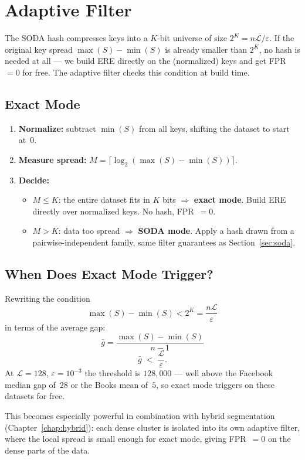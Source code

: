 \section{Adaptive Filter}
\label{sec:adaptive}

The SODA hash compresses keys into a $K$-bit universe of size $2^K = n\mathcal{L}/\varepsilon$.
If the original key spread $\max(S) - \min(S)$ is already smaller than $2^K$,
no hash is needed at all --- we build ERE directly on the (normalized) keys
and get FPR~$= 0$ for free.
The adaptive filter checks this condition at build time.

\subsection{Exact Mode}
\label{subsec:exact-mode}

\begin{enumerate}
    \item \textbf{Normalize:} subtract $\min(S)$ from all keys, shifting the dataset to
    start at~0.
    \item \textbf{Measure spread:} $M = \lceil \log_2(\max(S) - \min(S)) \rceil$.
    \item \textbf{Decide:}
    \begin{itemize}
        \item $M \leq K$: the entire dataset fits in $K$ bits $\Rightarrow$ \textbf{exact
        mode}. Build ERE directly over normalized keys. No hash, FPR~$= 0$.
        \item $M > K$: data too spread $\Rightarrow$ \textbf{SODA mode}. Apply
        a hash drawn from a pairwise-independent family, same filter guarantees as Section~\ref{sec:soda}.
    \end{itemize}
\end{enumerate}

\subsection{When Does Exact Mode Trigger?}

Rewriting the condition
\[
    \max(S) - \min(S) < 2^{K} = \frac{n\mathcal{L}}{\varepsilon}
\]
in terms of
the average gap:
\[
    \bar{g} = \frac{\max(S) - \min(S)}{n - 1}
\]
\begin{equation}
    \bar{g} \;<\; \frac{\mathcal{L}}{\varepsilon}.
    \label{eq:exact-threshold}
\end{equation}
At $\mathcal{L} = 128$, $\varepsilon = 10^{-3}$ the threshold is $128{,}000$ ---
well above the Facebook median gap of~$28$ or the Books mean of~$5$,
so exact mode triggers on these datasets for free.

This becomes especially powerful in combination with hybrid segmentation
(Chapter~\ref{chap:hybrid}): each dense cluster is isolated into its own adaptive filter,
where the local spread is small enough for exact mode, giving FPR~$= 0$ on the dense
parts of the data.
